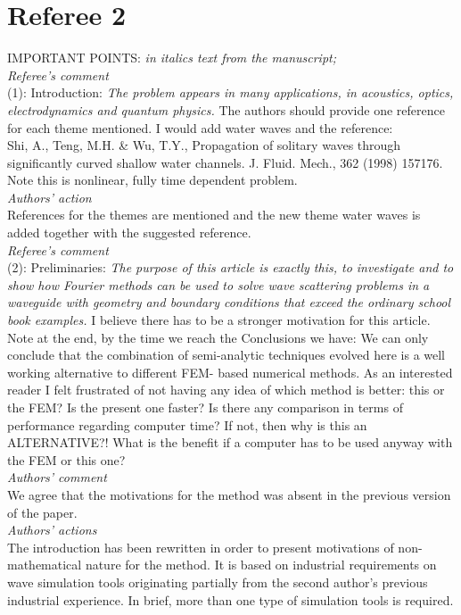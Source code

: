 \documentclass[a4paper,12pt]{article}%
\begin{document}
\section*{Referee 2}

IMPORTANT POINTS: \textit{in italics text from the manuscript;}\\
{\it Referee's comment}\\
(1): Introduction: \textit{The problem appears in many applications, in acoustics, optics,
electrodynamics and quantum physics.} The authors should provide one reference for each
theme mentioned. I would add water waves and the reference:\\
Shi, A., Teng, M.H. \& Wu, T.Y., Propagation of solitary waves through significantly
curved shallow water channels. J. Fluid. Mech., 362 (1998) 157176.\\
Note this is nonlinear, fully time dependent problem.\\
{\it Authors' action}\\
References for the themes are mentioned and the new theme water waves is added together with the suggested reference.\\
\newline
{\it Referee's comment}\\
(2): Preliminaries: \textit{The purpose of this article is exactly this, to investigate and to
show how Fourier methods can be used to solve wave scattering problems in a waveguide
with geometry and boundary conditions that exceed the ordinary school book examples.}
I believe there has to be a stronger motivation for this article. Note at the end, by
the time we reach the Conclusions we have: We can only conclude that the combination
of semi-analytic techniques evolved here is a well working alternative to different FEM-
based numerical methods. As an interested reader I felt frustrated of not having any
idea of which method is better: this or the FEM? Is the present one faster? Is there any
comparison in terms of performance regarding computer time? If not, then why is this
an ALTERNATIVE?! What is the benefit if a computer has to be used anyway with
the FEM or this one?\\
{\it Authors' comment}\\
We agree that the motivations for the method was absent in the previous version of the paper.\\
{\it Authors' actions}\\
The introduction has been rewritten in order to present motivations of non-mathematical nature for the method. It is based on industrial requirements on wave simulation tools originating partially from the second author's previous industrial experience. In brief, more than one type of simulation tools is required.
\end{document}
